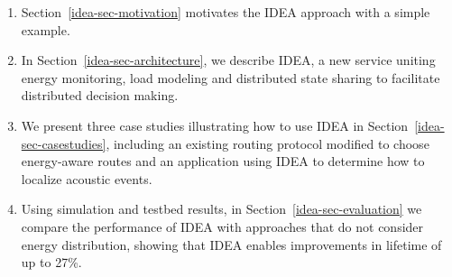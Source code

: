\begin{enumerate}

\item Section~\ref{idea-sec-motivation} motivates the IDEA approach with a
simple example.
\vspace*{-0.1in}
\item In Section~\ref{idea-sec-architecture}, we describe IDEA, a new service
uniting energy monitoring, load modeling and distributed state sharing to
facilitate distributed decision making.
\vspace*{-0.1in}
\item We present three case studies illustrating how to use IDEA in
Section~\ref{idea-sec-casestudies}, including an existing routing protocol
modified to choose energy-aware routes and an application using IDEA to
determine how to localize acoustic events.
\vspace*{-0.1in}
\item Using simulation and testbed results, in
Section~\ref{idea-sec-evaluation} we compare the performance of IDEA with
approaches that do not consider energy distribution, showing that IDEA
enables improvements in lifetime of up to 27\%.

\end{enumerate}
